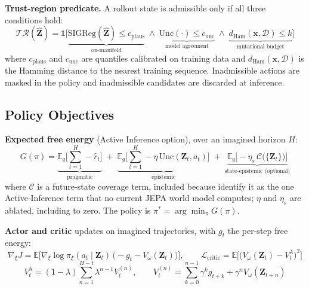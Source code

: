 \documentclass[12pt, a4paper]{article}
\begin{document}
\noindent \textbf{Trust-region predicate.} A rollout state is admissible only if all three conditions hold:
\begin{equation}
    \mathcal{T}\!\mathcal{R}(\hat{\mathbf{Z}}) = \mathbb{1}\Big[\underbrace{\mathrm{SIGReg}(\hat{\mathbf{Z}}) \leq c_\text{plaus}}_{\text{on-manifold}} \;\wedge\; \underbrace{\mathrm{Unc}(\cdot) \leq c_\text{unc}}_{\text{model agreement}} \;\wedge\; \underbrace{d_\text{Ham}(\mathbf{x}, \mathcal{D}) \leq k}_{\text{mutational budget}}\Big]
\end{equation}
where $c_\text{plaus}$ and $c_\text{unc}$ are quantiles calibrated on training data and $d_\text{Ham}(\mathbf{x}, \mathcal{D})$ is the Hamming distance to the nearest training sequence. Inadmissible actions are masked in the policy and inadmissible candidates are discarded at inference.

\subsection{Policy Objectives}

\noindent \textbf{Expected free energy} (Active Inference option), over an imagined horizon $H$:
\begin{equation}
    G(\pi) = \underbrace{\mathbb{E}_{q}\Big[\textstyle\sum_{t=1}^{H} -\hat{r}_t\Big]}_{\text{pragmatic}} \;+\; \underbrace{\mathbb{E}_{q}\Big[\textstyle\sum_{t=1}^{H} -\eta\,\mathrm{Unc}(\mathbf{Z}_t, a_t)\Big]}_{\text{epistemic}} \;+\; \underbrace{\mathbb{E}_{q}\Big[-\eta_s\,\mathcal{C}\big(\{\mathbf{Z}_t\}\big)\Big]}_{\text{state-epistemic (optional)}}
\end{equation}
where $\mathcal{C}$ is a future-state coverage term, included because \citet{arnez2026sigregfree} identify it as the one Active-Inference term that no current JEPA world model computes; $\eta$ and $\eta_s$ are ablated, including to zero. The policy is $\pi^* = \arg\min_\pi G(\pi)$.

\noindent \textbf{Actor and critic} updates on imagined trajectories, with $g_t$ the per-step free energy:
\begin{equation}
    \nabla_\xi J = \mathbb{E}\Big[\nabla_\xi \log \pi_\xi(a_t \mid \mathbf{Z}_t)\,\big(-g_t - V_\omega(\mathbf{Z}_t)\big)\Big], \qquad
    \mathcal{L}_\text{critic} = \mathbb{E}\Big[\big(V_\omega(\mathbf{Z}_t) - V_t^{\lambda}\big)^2\Big]
\end{equation}
\begin{equation}
    V_t^{\lambda} = (1-\lambda)\sum_{n=1}^{H-t} \lambda^{n-1} V_t^{(n)}, \qquad V_t^{(n)} = \sum_{k=0}^{n-1} \gamma^k g_{t+k} + \gamma^n V_\omega(\mathbf{Z}_{t+n})
\end{equation}
\end{document}
